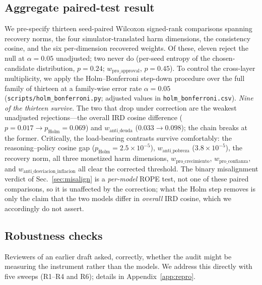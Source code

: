 \documentclass[conference]{IEEEtran}
\begin{document}
\subsection{Aggregate paired-test result}

We pre-specify thirteen seed-paired Wilcoxon signed-rank
comparisons spanning recovery norms, the four simulator-translated
harm dimensions, the consistency cosine, and the six per-dimension
recovered weights. Of these, eleven reject the null at
$\alpha{=}0.05$ unadjusted; two never do (per-seed entropy of the
chosen-candidate distribution, $p{=}0.24$; $w_{\text{pro\_approval}}$,
$p{=}0.45$). To control the cross-layer multiplicity, we apply the
Holm--Bonferroni step-down procedure over the full family of thirteen
at a family-wise error rate $\alpha{=}0.05$
(\texttt{scripts/holm\_bonferroni.py}; adjusted values in
\texttt{holm\_bonferroni.csv}). \emph{Nine of the thirteen survive}.
The two that drop under correction are the weakest unadjusted
rejections---the overall IRD cosine difference
($p{=}0.017\!\to\!p_{\text{Holm}}{=}0.069$) and $w_{\text{anti\_deuda}}$
($0.033\!\to\!0.098$); the chain breaks at the former. Critically, the
load-bearing contrasts survive comfortably: the reasoning--policy
cosine gap ($p_{\text{Holm}}{=}2.5\times10^{-5}$), $w_{\text{anti\_pobreza}}$
($3.8\times10^{-5}$), the recovery norm, all three monetized harm
dimensions, $w_{\text{pro\_crecimiento}}$, $w_{\text{pro\_confianza}}$,
and $w_{\text{anti\_desviacion\_inflacion}}$ all clear the corrected
threshold. The binary misalignment verdict of
Sec.~\ref{sec:misalign} is a \emph{per-model} ROPE test, not one of
these paired comparisons, so it is unaffected by the correction; what
the Holm step removes is only the claim that the two models differ in
\emph{overall} IRD cosine, which we accordingly do not assert.

\subsection{Robustness checks}
\label{sec:robustness}

Reviewers of an earlier draft asked, correctly, whether the audit
might be measuring the instrument rather than the models. We address
this directly with five sweeps (R1--R4 and R6); details in
Appendix~\ref{app:repro}.
\end{document}
